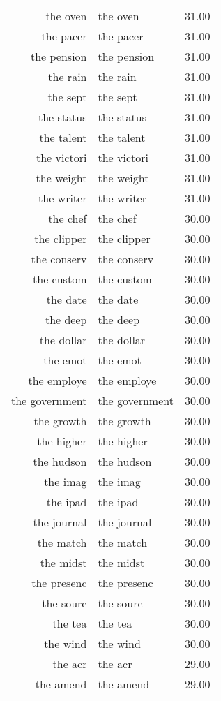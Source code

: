 \begin{table}[ht]
\begin{tabular}{rlr}
  the oven & the oven & 31.00 \\ 
  the pacer & the pacer & 31.00 \\ 
  the pension & the pension & 31.00 \\ 
  the rain & the rain & 31.00 \\ 
  the sept & the sept & 31.00 \\ 
  the status & the status & 31.00 \\ 
  the talent & the talent & 31.00 \\ 
  the victori & the victori & 31.00 \\ 
  the weight & the weight & 31.00 \\ 
  the writer & the writer & 31.00 \\ 
  the chef & the chef & 30.00 \\ 
  the clipper & the clipper & 30.00 \\ 
  the conserv & the conserv & 30.00 \\ 
  the custom & the custom & 30.00 \\ 
  the date & the date & 30.00 \\ 
  the deep & the deep & 30.00 \\ 
  the dollar & the dollar & 30.00 \\ 
  the emot & the emot & 30.00 \\ 
  the employe & the employe & 30.00 \\ 
  the government & the government & 30.00 \\ 
  the growth & the growth & 30.00 \\ 
  the higher & the higher & 30.00 \\ 
  the hudson & the hudson & 30.00 \\ 
  the imag & the imag & 30.00 \\ 
  the ipad & the ipad & 30.00 \\ 
  the journal & the journal & 30.00 \\ 
  the match & the match & 30.00 \\ 
  the midst & the midst & 30.00 \\ 
  the presenc & the presenc & 30.00 \\ 
  the sourc & the sourc & 30.00 \\ 
  the tea & the tea & 30.00 \\ 
  the wind & the wind & 30.00 \\ 
  the acr & the acr & 29.00 \\ 
  the amend & the amend & 29.00 \\ 

\end{tabular}
\end{table}
